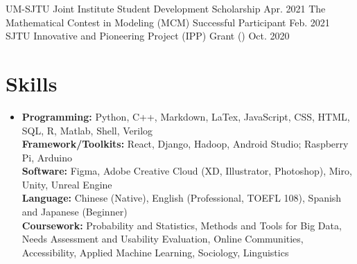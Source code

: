 \resumePOR{} %
    {UM-SJTU Joint Institute Student Development Scholarship} %
    {Apr. 2021} %
      \vspace{-1.5mm}  
\resumePOR{} %
    {The Mathematical Contest in Modeling (MCM) Successful Participant} %
    {Feb. 2021} %
      \vspace{-1.5mm}  
\resumePOR{} %
{SJTU Innovative and Pioneering Project (IPP) Grant ()} %
    {Oct. 2020} %
      \vspace{-1.5mm}  

\resumeSubHeadingListEnd
\vspace{-5mm}
\section{\textbf{Skills}}
\vspace{1mm}
 \begin{itemize}[leftmargin=0.05in, label={}]
\item \textbf{Programming: }{Python, C++, Markdown, LaTex, JavaScript, CSS, HTML, SQL, R, Matlab, Shell, Verilog} \\
\textbf{Framework/Toolkits: }{React, Django, Hadoop, Android Studio; Raspberry Pi, Arduino}\\
\textbf{Software: }Figma, Adobe Creative Cloud (XD, Illustrator, Photoshop), Miro, Unity, Unreal Engine\\
\textbf{Language: }Chinese (Native), English (Professional, TOEFL 108), Spanish and Japanese (Beginner)\\
\textbf{Coursework: }Probability and Statistics, Methods and Tools for Big Data, Needs Assessment and Usability Evaluation, Online Communities, Accessibility, Applied Machine Learning, Sociology, Linguistics




    
 \end{itemize}
 \vspace{-16pt}